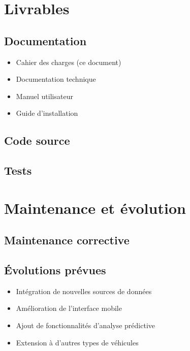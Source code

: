 \documentclass[12pt,a4paper]{article}
\begin{document}
\section{Livrables}

\subsection{Documentation}

\begin{itemize}
    \item Cahier des charges (ce document)
    \item Documentation technique
    \item Manuel utilisateur
    \item Guide d'installation
\end{itemize}

\subsection{Code source}

\lipsum[18]

\subsection{Tests}

\lipsum[19]

\section{Maintenance et évolution}

\subsection{Maintenance corrective}

\lipsum[20]

\subsection{Évolutions prévues}

\begin{itemize}
    \item Intégration de nouvelles sources de données
    \item Amélioration de l'interface mobile
    \item Ajout de fonctionnalités d'analyse prédictive
    \item Extension à d'autres types de véhicules
\end{itemize}
\end{document}
